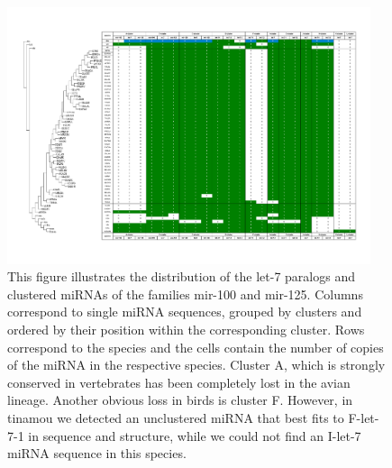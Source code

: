 \documentclass[10pt]{bmc_article}
\newenvironment{bmcformat}{\begin{raggedright}\baselineskip20pt\sloppy\setboolean{publ}{false}}{\end{raggedright}\baselineskip20pt\sloppy}
\begin{document}
\begin{bmcformat}
\begin{figure}[ht]
  \includegraphics[width=0.95\textwidth]{figures/let-7-cluster.pdf}
  \caption[Presence/absence table of let-7 miRNA clusters]{This figure illustrates the distribution of the let-7 paralogs and clustered miRNAs of the families mir-100 and mir-125. Columns correspond to single miRNA sequences, grouped by clusters and ordered by their position within the corresponding cluster. Rows correspond to the species and the cells contain the number of copies of the miRNA in the respective species. Cluster A, which is strongly conserved in vertebrates has been completely lost in the avian lineage. Another obvious loss in birds is cluster F. However, in tinamou we detected an unclustered miRNA that best fits to F-let-7-1 in sequence and structure, while we could not find an I-let-7 miRNA sequence in this species.}\label{fig:9}
\end{figure}



\end{bmcformat}
\end{document}
